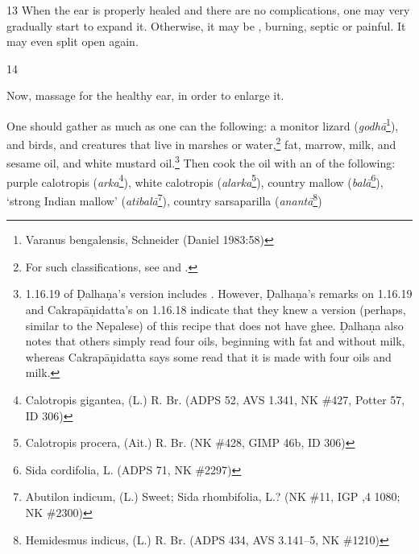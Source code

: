 \begin{translation}
    \item[13] When the ear is properly healed and there are no complications,  one may
    very gradually start to expand it.  Otherwise, it may be ,
    burning, septic or painful.  It may even split open again.
    
    
    \item [14]
    
    
    Now, massage for the healthy ear, in order to enlarge it. 
    
    \newcommand{\animal}[4]{#1 (\emph{#2}\footnote{#3 (#4)})}
    \newcommand{\plant}[4]{#1 (\emph{#2}\footnote{#3 (#4)})}
    \newcommand\skt[2]{#1 (#2)}
    
    One should gather as much as one can the following: a
    \animal{monitor lizard}{godhā}{Varanus bengalensis, Schneider}{Daniel
        1983:58},
     and  birds, and
    creatures that live in marshes or water,\footnote{For such classifications,
    see \citet{zimm-jung} and \citet{smit-clas}.} fat, marrow, milk, and sesame oil, and
    white mustard oil.\footnote{1.16.19 of Ḍalhaṇa's version \citep[79]{vulgate} includes . However, Ḍalhaṇa's remarks on 1.16.19 and Cakrapāṇidatta's on 1.16.18 \citep[130]{acar-1939} indicate that they knew a version (perhaps, similar to the Nepalese) of this recipe that does not have ghee. Ḍalhaṇa also notes that others simply read four oils, beginning with fat and without milk, whereas Cakrapāṇidatta says some read that it is made with four oils and milk.} %
Then cook the oil with an  of the following:
    \plant{purple calotropis}{arka}{Calotropis gigantea, (L.) R. Br.}{ADPS 52, AVS
        1.341, NK \#427, Potter 57, ID 306},
    \plant{white calotropis}{alarka}{Calotropis procera, (Ait.) R. Br.}{NK
        \#428, GIMP 46b, ID 306},
    \plant{country mallow}{balā}{Sida cordifolia, L.}{ADPS 71, NK \#2297},
    \plant{`strong Indian mallow'}{atibalā}{Abutilon indicum, (L.) Sweet; Sida
        rhombifolia, L.?}{NK \#11, IGP ,4 1080; NK \#2300},
    \plant{country sarsaparilla}{anantā}{Hemidesmus indicus, (L.) R. Br.}{ADPS 434,
        AVS 3.141--5, NK \#1210}

\end{translation}
